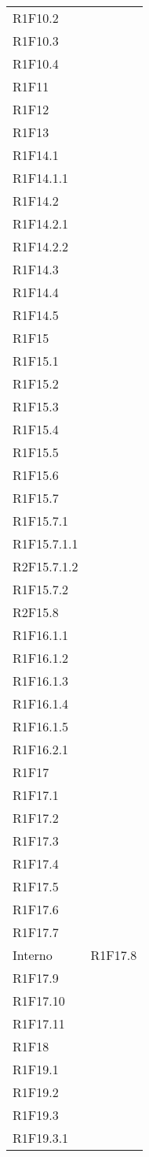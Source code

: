 \begin{longtable}{ >{\centering\arraybackslash}m{}
			>{\centering}p{}}
		R1F10.2\\
		R1F10.3\\
		R1F10.4\\
		R1F11\\
		R1F12\\
		R1F13\\
		R1F14.1\\
		R1F14.1.1\\
		R1F14.2\\
		R1F14.2.1\\
		R1F14.2.2\\
		R1F14.3\\
		R1F14.4\\
		R1F14.5\\
		R1F15\\
		R1F15.1\\
		R1F15.2\\
		R1F15.3\\
		R1F15.4\\
		R1F15.5\\
		R1F15.6\\
		R1F15.7\\
		R1F15.7.1\\
		R1F15.7.1.1\\
		R2F15.7.1.2\\
		R1F15.7.2\\
		R2F15.8\\
		R1F16.1.1\\
		R1F16.1.2\\
		R1F16.1.3\\
		R1F16.1.4\\
		R1F16.1.5\\
		R1F16.2.1\\
		R1F17\\
		R1F17.1\\
		R1F17.2\\
		R1F17.3\\
		R1F17.4\\
		R1F17.5\\
		R1F17.6\\
		R1F17.7 \tabularnewline
		Interno	&
		R1F17.8\\
		R1F17.9\\
		R1F17.10\\
		R1F17.11\\
		R1F18\\
		R1F19.1\\
		R1F19.2\\
		R1F19.3\\
		R1F19.3.1\\

\end{longtable}
